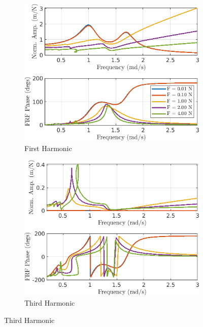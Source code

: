 \documentclass[12pt]{article}
\begin{document}
\begin{figure}[!h]
  \centering
  \begin{subfigure}{0.5\textwidth}
    \includegraphics[width=\linewidth]{FIGS/B_FRESP_hi1_33}
    \caption{First Harmonic}
  \end{subfigure}%
  \begin{subfigure}{0.5\textwidth}
    \includegraphics[width=\linewidth]{FIGS/B_FRESP_hi3_33}
    \caption{Third Harmonic}
  \end{subfigure}


\end{figure}
\end{document}
